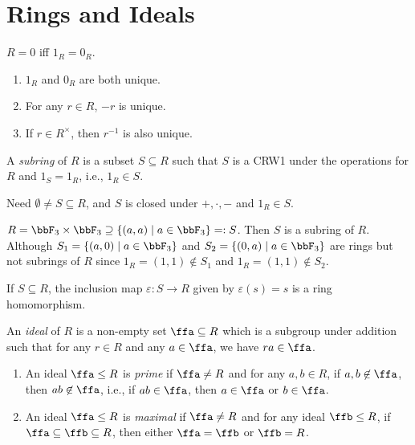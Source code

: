\chapter{Rings and Ideals}

\begin{remark}[Fact]
    $R = 0$ iff $1_R = 0_R$.
\end{remark}

\begin{remark}[Fact]
    \begin{enumerate}[(1)]
        \item $1_R$ and $0_R$ are both unique.
        \item For any $r \in R$, $-r$ is unique.
        \item If $r \in R^\times$, then $r^{-1}$ is also unique.
    \end{enumerate}
\end{remark}

\begin{definition}
    A \emph{subring} of $R$ is a subset $S \subseteq R$ such that $S$ is a CRW1 under the operations for $R$ and $1_S = 1_R$, i.e., $1_R \in S$.
\end{definition}

\begin{remark}
    Need $\emptyset \neq S \subseteq R$, and $S$ is closed under $+,\cdot,-$ and $1_R \in S$.
\end{remark}

\begin{example}
    $R = \bbF_3 \times \bbF_3 \supseteq \{(a,a) \mid a \in \bbF_3\} =: S$. Then $S$ is a subring of $R$. Although $S_1 = \{(a,0) \mid a \in \bbF_3\}$ and $S_2 = \{(0,a) \mid a \in \bbF_3\}$ are rings but not subrings of $R$ since $1_R = (1,1) \not \in S_1$ and $1_R = (1,1) \not \in S_2$. 
\end{example}

\begin{remark}[Fact]
    If $S \subseteq R$, the inclusion map $\varepsilon: S \to R$ given by $\varepsilon(s) = s$ is a ring homomorphism.
\end{remark}

\begin{definition}
    An \emph{ideal} of $R$ is a non-empty set $\ffa \subseteq R$ which is a subgroup under addition such that for any $r \in R$ and any $a \in \ffa$, we have $ra \in \ffa$. 
    \begin{enumerate}[(1)]
        \item 
            An ideal $\ffa \leq R$ is \emph{prime} if $\ffa \neq R$ and for any $a,b \in R$, if $a,b \not \in \ffa$, then $ab \not \in \ffa$, i.e., if $ab \in \ffa$, then $a \in \ffa$ or $b \in \ffa$. 
        \item 
            An ideal $\ffa \leq R$ is \emph{maximal} if $\ffa \neq R$ and for any ideal $\ffb \leq R$, if $\ffa \subseteq \ffb \subseteq R$, then either $\ffa = \ffb$ or $\ffb = R$.
    \end{enumerate}
\end{definition}

